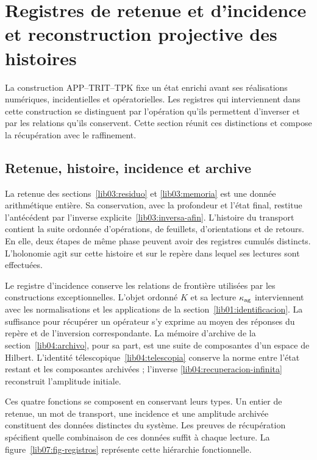 \section{Registres de retenue et d’incidence et reconstruction projective des histoires}
\label{lib07:armonizacion}
La construction APP--TRIT--TPK fixe un état enrichi avant
ses réalisations numériques, incidentielles et opératorielles. Les registres
qui interviennent dans cette construction se distinguent par l’opération
qu’ils permettent d’inverser et par les relations qu’ils conservent. Cette section
réunit ces distinctions et compose la récupération avec le raffinement.

\subsection{Retenue, histoire, incidence et archive}
La retenue des sections~\ref{lib03:residuo} et
\ref{lib03:memoria} est une donnée arithmétique entière. Sa conservation,
avec la profondeur et l’état final, restitue l’antécédent
par l’inverse explicite~\eqref{lib03:inversa-afin}.
L’histoire du transport contient la suite ordonnée d’opérations,
de feuillets, d’orientations et de retours. En elle, deux étapes de même phase
peuvent avoir des registres cumulés distincts. L’holonomie agit sur
cette histoire et sur le repère dans lequel ses lectures sont effectuées.

Le registre d’incidence conserve les relations de frontière
utilisées par les constructions exceptionnelles. L’objet ordonné \(K\)
et sa lecture \(\kappa_{\rm ag}\) interviennent avec les normalisations
et les applications de la section~\ref{lib01:identificacion}.
La suffisance pour récupérer un opérateur s’y exprime au moyen
des réponses du repère et de l’inversion correspondante.
La mémoire d’archive de la section~\ref{lib04:archivo}, pour sa part,
est une suite de composantes d’un espace de Hilbert. L’identité
télescopique~\eqref{lib04:telescopia} conserve la norme entre l’état
restant et les composantes archivées ; l’inverse
\eqref{lib04:recuperacion-infinita} reconstruit l’amplitude initiale.

Ces quatre fonctions se composent en conservant leurs types. Un entier de retenue, un mot de transport, une incidence et une amplitude archivée constituent des données distinctes du système. Les preuves de récupération spécifient quelle combinaison de ces données suffit à chaque lecture. La figure~\ref{lib07:fig-registros} représente cette hiérarchie fonctionnelle.

